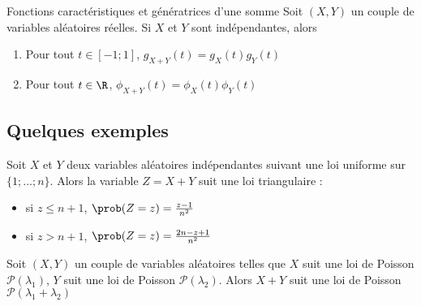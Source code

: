 \begin{proposition}{Fonctions caractéristiques et génératrices d'une somme}{}
	Soit  $(X,Y)$ un couple de variables aléatoires réelles. Si $X$ et $Y$ sont indépendantes, alors 
	\begin{enumerate}
		\item Pour tout $t \in [-1;1]$, $g_{X+Y}(t)=g_X(t)g_Y(t)$
		\item Pour tout $t \in \R $, $\phi_{X+Y}(t)=\phi_X(t)\phi_Y(t)$
	\end{enumerate}

\end{proposition}

\subsection{Quelques exemples}

	\begin{exemple}{}{}
		Soit $X$ et $Y$ deux variables aléatoires indépendantes suivant une loi uniforme sur $\{1;...;n\}$. Alors la variable $Z=X+Y$ suit une loi  triangulaire : 
		\begin{itemize}
			\item si $z \leq n+1$,  $\prob(Z=z)= \frac{z-1}{n^2}$
			\item si $z > n+1$,  $\prob(Z=z) = \frac{2n-z+1}{n^2}$
		\end{itemize}
	\end{exemple}


\begin{proposition}{}{}
	Soit  $(X,Y)$ un couple de variables aléatoires  telles que $X$ suit une loi de Poisson $\mathcal{P}(\lambda_1)$, $Y$ suit une loi de Poisson $\mathcal{P}(\lambda_2)$. Alors $X+Y$ suit une loi de Poisson $\mathcal{P}(\lambda_1+\lambda_2)$
\end{proposition}


